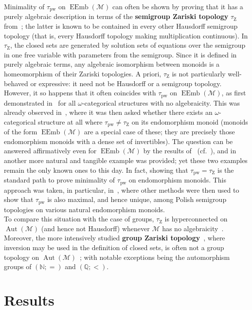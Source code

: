 \documentclass{article}
\theoremstyle{remark}
\theoremstyle{definition}
\DeclareMathOperator{\Aut}{Aut}
\DeclareMathOperator{\EEmb}{EEmb}
\newcommand{\M}[0]{\mathcal{M}}
\newcommand{\pw}[0]{\tau_{\mathrm{pw}}}
\newcommand{\zar}[0]{\tau_{\mathrm{Z}}}
\begin{document}
Minimality of $\pw$ on  $\EEmb(\M)$ can often be shown by proving that it  has a purely algebraic description in terms of the \textbf{semigroup Zariski topology} $\zar$ from~\cite{elliott2023automatic}; the latter is known to be contained in every other Hausdorff semigroup topology {(that is, every Hausdorff topology making multiplication continuous)}. In $\zar$, the closed sets are generated by  solution sets of equations over the semigroup in one free variable with parameters from the semigroup. Since it is defined in purely algebraic terms, any algebraic isomorphism between monoids is a homeomorphism of their Zariski topologies. 
A priori,  $\zar$ is not particularly well-behaved or expressive: it need not be Hausdorff or a semigroup topology. However, it so happens that it often coincides with $\pw$ on   $\EEmb(\M)$, as first demonstrated in~\cite{pinskerschindler} for all $\omega$-categorical structures with no algebraicity. This was already observed in~\cite{elliott2023polish}, where it was then asked whether there exists an $\omega$-categorical structure  at all where $\pw\neq\zar$ on its endomorphism monoid (monoids of the form $\EEmb(\M)$ are a special case of these; they are precisely those endomorphism monoids with a dense set of invertibles). The question can be answered affirmatively even for $\EEmb(\M)$ %
 by the results of~\cite{BodirskyEvansKompatscherPinsker} (cf.~\cite{marimon2025guide}), and in~\cite{pinskerschindler} another more natural and tangible example was provided; yet these two examples remain the only known ones to this day.
 In fact, showing that $\pw=\zar$ is the standard path to prove minimality of $\pw$ on endomorphism monoids. This approach was taken, in particular, in~\cite{elliott2023automatic,elliott2023polish,pinskerschindlerQ}, where %
 other methods were then used to show that $\pw$ is also maximal, and hence unique, among Polish semigroup topologies on various natural endomorphism monoids.
\\ 

To compare this situation  with the case of groups,  $\zar$ is hyperconnected on $\Aut(\M)$ (and hence not Hausdorff) whenever $\M$ has no algebraicity~\cite{bardyla2025note}. {Moreover, }
the more intensively studied \textbf{group Zariski  topology}~\cite{bryant1977verbal}, where inversion may be used in the definition of closed sets, is often not a group topology on $\Aut(\M)$~\cite{ghaddln24}; with notable exceptions being the automorphism groups of $(\mathbb{N}; =)$ and $(\mathbb{Q}; <)$.


\section{Results}
\end{document}
